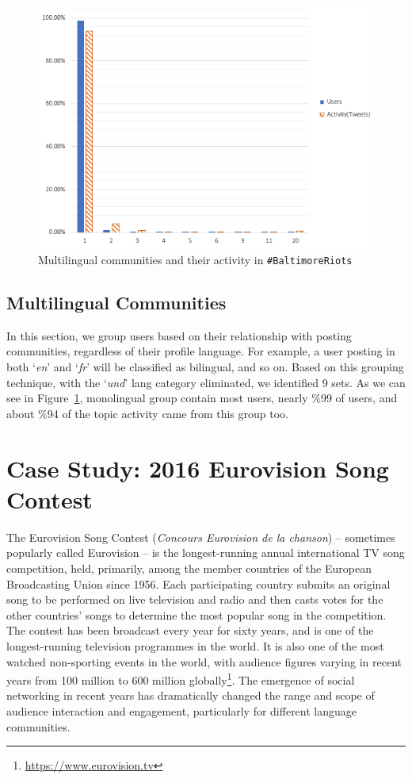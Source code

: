 \begin{figure}[htb]
\centering
\includegraphics[width=\columnwidth]{images/baltimore_multilingual.png}
\caption{Multilingual communities and their activity in {\texttt{\#BaltimoreRiots}}}
\label{fig:baltimore_multilingual}
\end{figure}

\subsection{Multilingual Communities}
In this section, we group users based on their relationship with
posting communities, regardless of their profile language. For
example, a user posting in both `{\emph{en}}' and `{\emph{fr}}' will
be classified as bilingual, and so on. Based on this grouping
technique, with the `{\emph{und}}' lang category eliminated, we
identified 9 sets. As we can see in Figure~\ref{fig:baltimore_multilingual}, monolingual group contain most users, nearly \%99 of users, and about \%94 
of the topic activity came from this group too.

\section{Case Study: 2016 Eurovision Song
  Contest}\label{eurovisioncasestudy}

The Eurovision Song Contest ({\emph{Concours Eurovision de la
chanson}}) -- sometimes popularly called Eurovision -- is the
longest-running annual international TV song competition, held,
primarily, among the member countries of the European Broadcasting
Union since 1956. Each participating country submits an original
song to be performed on live television and radio and then casts votes
for the other countries' songs to determine the most popular song in
the competition. The contest has been broadcast every year for sixty
years, and is one of the longest-running television programmes in the
world. It is also one of the most watched non-sporting events in the
world, with audience figures varying in recent years from 100 million
to 600 million globally\footnote{\url{https://www.eurovision.tv}}. The
emergence of social networking in recent years has dramatically
changed the range and scope of audience interaction and engagement,
particularly for different language communities.

